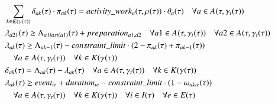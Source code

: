 \begin{alignat}{2}
    & \sum_{\ElementWorkSegment \in \SetWorkSegment} \VarProcessingTime \cdot \VarActiveSegment{\ElementActivity}{\ElementWorkSegment} = \ParActivityWork{} \cdot \VarIncludeActivity{\ElementActivity}                                                                                                                                            \quad \forall \ElementActivity \in \SetActivity{\VarSupervisorAssignment{}{\ElementTechnician}}{}                                                                                                      \\
	& \VarStartOfSegment{\ElementActivity2}{1} \geq \VarFinishOfSegment{\ElementActivity1}{last(\ElementActivity1)} + \ParPreparation                                                                    \quad \forall \ElementActivity1 \in \SetActivity{\VarSupervisorAssignment{}{\ElementTechnician}}{} \quad \forall \ElementActivity2 \in \SetActivity{\VarSupervisorAssignment{}{\ElementTechnician}}{}  \\
	& \VarStartOfSegment{\ElementActivity}{\ElementWorkSegment} \geq \VarFinishOfSegment{\ElementActivity}{\ElementWorkSegment-1} - \ParConstraintLimit \cdot (2 - \VarActiveSegment{\ElementActivity}{\ElementWorkSegment} + \VarActiveSegment{\ElementActivity}{\ElementWorkSegment-1})                                                                      \notag\\
	& \quad \forall \ElementActivity \in \SetActivity{\VarSupervisorAssignment{}{\ElementTechnician}}{} \quad\forall \ElementWorkSegment \in \SetWorkSegment                                                 \\ 
	& \VarProcessingTime = \VarFinishOfSegment{\ElementActivity}{\ElementWorkSegment} - \VarStartOfSegment{\ElementActivity}{\ElementWorkSegment}                                                                                                                                              \quad \forall \ElementActivity \in \SetActivity{\VarSupervisorAssignment{}{\ElementTechnician}}{}  \quad\forall \ElementWorkSegment \in \SetWorkSegment                                                \\
	& \VarStartOfSegment{\ElementActivity}{\ElementWorkSegment} \geq \ParEvent + \ParEventDuration - \ParConstraintLimit \cdot (1 - \VarSegmentInRelation) \notag\\ 
	& \quad \forall \ElementActivity \in \SetActivity{\VarSupervisorAssignment{}{\ElementTechnician}}{}  \quad\forall \ElementWorkSegment \in \SetWorkSegment                                           \quad \forall i \in \SetTimeInstance  \quad\forall \ElementEvent \in \SetEvent                                                                                                                         \\

\end{alignat}
